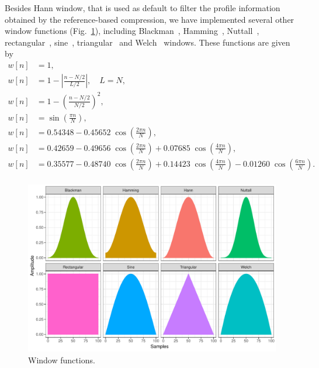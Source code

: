 Besides Hann window, that is used as default to filter the profile information obtained by the reference-based compression, we have implemented several other window functions (Fig.~\ref{fig.filters}), including Blackman~\cite{blackman1959particular}, Hamming~\cite{tukey1949measuring}, Nuttall~\cite{nuttall1981some}, rectangular~\cite{oppenheim1999discrete}, sine~\cite{harris1978use}, triangular~\cite{bartlett1950periodogram} and Welch~\cite{welch1967use} windows. These functions are given by
\begin{align}
  w[n] &= 1,
  \tag*{(rectangular)} \\
  w[n] &= 1-\left|\tfrac {n-N/2}{L/2}\right|, \quad L=N,
  \tag*{(triangular/Bartlett)} \\
  w[n] &= 1-\left(\tfrac {n-N/2}{N/2}\right)^{2},
  \tag*{(Welch)} \\
  w[n] &= \sin \left(\tfrac {\pi n}{N}\right),
  \tag*{(sine)} \\
  w[n] &= 0.54348-0.45652\;\cos \left(\tfrac {2\pi n}{N}\right),
  \tag*{(Hamming)} \\
  w[n] &= 0.42659-0.49656\;\cos \left(\tfrac {2\pi n}{N}\right)+0.07685\;\cos \left(\tfrac {4\pi n}{N}\right),
  \tag*{(Blackman)} \\
  w[n] &= 0.35577-0.48740\;\cos \left(\tfrac {2\pi n}{N}\right)+0.14423\;\cos \left(\tfrac {4\pi n}{N}\right)-0.01260\;\cos \left(\tfrac {6\pi n}{N}\right).
  \tag*{(Nuttall)} \\
\end{align}

\begin{figure}[!h]
  \centering
\includegraphics[width=.95\linewidth]{filters.pdf}
\caption{Window functions.}
\label{fig.filters}
\end{figure}